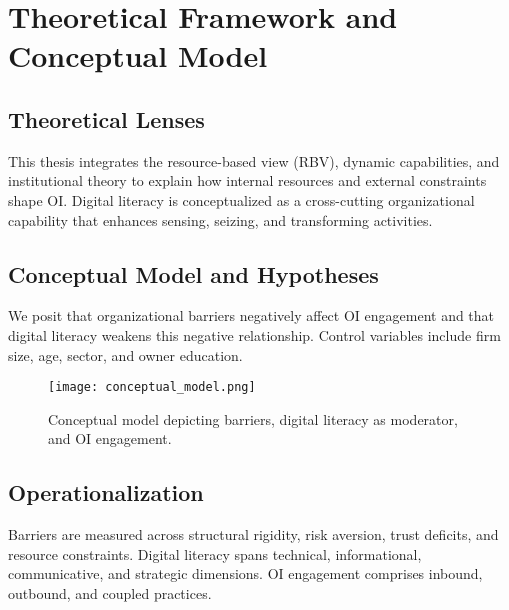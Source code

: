 \chapter{Theoretical Framework and Conceptual Model}\label{ch:framework}

\section{Theoretical Lenses}
This thesis integrates the resource-based view (RBV), dynamic capabilities, and institutional theory to explain how internal resources and external constraints shape OI. Digital literacy is conceptualized as a cross-cutting organizational capability that enhances sensing, seizing, and transforming activities.

\section{Conceptual Model and Hypotheses}
We posit that organizational barriers negatively affect OI engagement and that digital literacy weakens this negative relationship. Control variables include firm size, age, sector, and owner education.

\begin{figure}[H]
  \centering
  \texttt{[image: conceptual\_model.png]}
  \caption{Conceptual model depicting barriers, digital literacy as moderator, and OI engagement.}
  \label{fig:conceptual_model}
\end{figure}

\section{Operationalization}
Barriers are measured across structural rigidity, risk aversion, trust deficits, and resource constraints. Digital literacy spans technical, informational, communicative, and strategic dimensions. OI engagement comprises inbound, outbound, and coupled practices.
